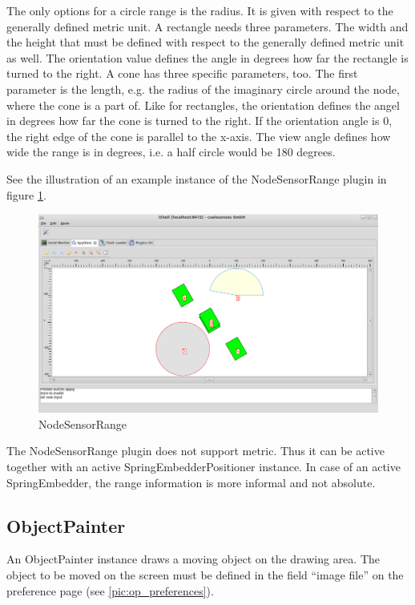 The only options for a circle range is the radius. It is given with respect to the generally defined metric unit.
A rectangle needs three parameters. The width and the height that must be defined with respect to the generally
defined metric unit as well. The orientation value defines the angle in degrees how far the rectangle is
turned to the right. A cone has three specific parameters, too. The first parameter is the length, e.g. the
radius of the imaginary circle around the node, where the cone is a part of. Like for rectangles, the orientation
defines the angel in degrees how far the cone is turned to the right. If the orientation angle is 0, the right
edge of the cone is parallel to the x-axis. The view angle defines how wide the range is
in degrees, i.e. a half circle would be 180 degrees.

See the illustration of an example instance of the NodeSensorRange plugin in figure \ref{pic:nsr}.

\begin{figure}[htb]
  \begin{center}
    \includegraphics[width=13.2cm]{./pics/nodesensorrange}
    \caption{NodeSensorRange}
    \label{pic:nsr}
  \end{center}
\end{figure}

The NodeSensorRange plugin does not support metric. Thus it can be active together with an active SpringEmbedderPositioner
instance. In case of an active SpringEmbedder, the range information is more informal and not absolute.

\subsection{ObjectPainter}

An ObjectPainter instance draws a moving object on the drawing area. The object to be moved on the screen must be
defined in the field ``image file'' on the preference page (see \ref{pic:op_preferences}).

